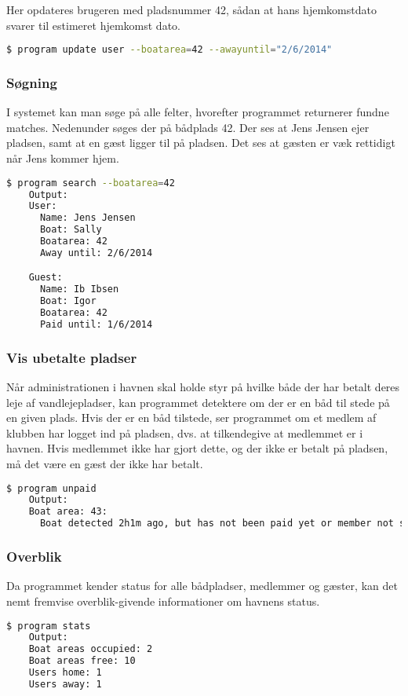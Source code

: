 Her opdateres brugeren med pladsnummer 42, sådan at hans hjemkomstdato svarer til estimeret hjemkomst dato.

\begin{lstlisting}[language=bash, label={lst:update_travel}] 
  $ program update user --boatarea=42 --awayuntil="2/6/2014" 
\end{lstlisting}

\subsubsection{Søgning}
\label{ssub:Sogning}

I systemet kan man søge på alle felter, hvorefter programmet returnerer fundne matches. Nedenunder søges der på bådplads 42. Der ses at Jens Jensen ejer pladsen, samt at en gæst ligger til på pladsen. Det ses at gæsten er væk rettidigt når Jens kommer hjem.

\begin{lstlisting}[language=bash, label={lst:search}] 
  $ program search --boatarea=42
    Output:
    User:
      Name: Jens Jensen
      Boat: Sally
      Boatarea: 42
      Away until: 2/6/2014 

    Guest:
      Name: Ib Ibsen
      Boat: Igor
      Boatarea: 42
      Paid until: 1/6/2014
\end{lstlisting}

\subsubsection{Vis ubetalte pladser}
\label{ssub:Vis_ubetalte_pladser}

Når administrationen i havnen skal holde styr på hvilke både der har betalt deres leje af vandlejepladser, kan programmet detektere om der er en båd til stede på en given plads. Hvis der er en båd tilstede, ser programmet om et medlem af klubben har logget ind på pladsen, dvs. at tilkendegive at medlemmet er i havnen. Hvis medlemmet ikke har gjort dette, og der ikke er betalt på pladsen, må det være en gæst der ikke har betalt.

\begin{lstlisting}[language=bash, label={lst:show_unpaid}] 
  $ program unpaid
    Output:
    Boat area: 43:
      Boat detected 2h1m ago, but has not been paid yet or member not signed in. 
\end{lstlisting}

\subsubsection{Overblik}
\label{ssub:overblik}

Da programmet kender status for alle bådpladser, medlemmer og gæster, kan det nemt fremvise overblik-givende informationer om havnens status.

\begin{lstlisting}[language=bash, label={lst:overview}] 
  $ program stats 
    Output:
    Boat areas occupied: 2
    Boat areas free: 10
    Users home: 1
    Users away: 1
\end{lstlisting}
